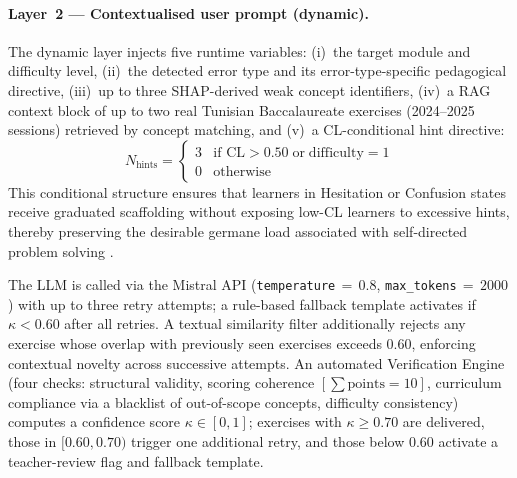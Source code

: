 \documentclass[ASNA,twocolumn]{USG} %
\begin{document}
\paragraph{Layer~2 --- Contextualised user prompt (dynamic).}
The dynamic layer injects five runtime variables: (i)~the target
module and difficulty level, (ii)~the detected error type and its
error-type-specific pedagogical directive, (iii)~up to three
SHAP-derived weak concept identifiers, (iv)~a RAG context block of
up to two real Tunisian Baccalaureate exercises (2024--2025 sessions)
retrieved by concept matching, and (v)~a CL-conditional hint
directive:
\begin{equation}
\label{eq:hint_cond}
N_{\text{hints}} =
\begin{cases}
3 & \text{if } \text{CL} > 0.50 \;\text{or}\;
    \mathrm{difficulty} = 1 \\
0 & \text{otherwise}
\end{cases}
\end{equation}
This conditional structure ensures that learners in Hesitation or
Confusion states receive graduated scaffolding without exposing
low-CL learners to excessive hints, thereby preserving the desirable
germane load associated with self-directed problem solving
\cite{Paas1992}.

The LLM is called via the Mistral API
(\texttt{temperature}$\,{=}\,0.8$, \texttt{max\_tokens}$\,{=}\,2000$)
with up to three retry attempts; a rule-based fallback template
activates if $\kappa < 0.60$ after all retries.
A textual similarity filter additionally rejects any exercise whose
overlap with previously seen exercises exceeds $0.60$, enforcing
contextual novelty across successive attempts.
An automated Verification Engine (four checks: structural validity,
scoring coherence $[\sum\text{points}=10]$, curriculum compliance
via a blacklist of out-of-scope concepts, difficulty consistency)
computes a confidence score $\kappa \in [0,1]$; exercises with
$\kappa \geq 0.70$ are delivered, those in $[0.60, 0.70)$ trigger
one additional retry, and those below $0.60$ activate a
teacher-review flag and fallback template.
\end{document}
